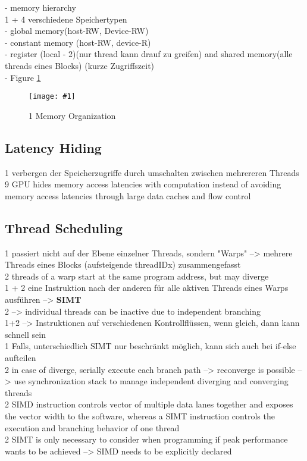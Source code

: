\documentclass[a4paper,12pt]{llncs}
\numberwithin{equation}{section}
\newcommand{\bild}[4]{
  \begin{figure}[htbp]
    \begin{center}
      \texttt{[image: \#1]}
      \caption[#4]{#3}
      \label{#2}
    \end{center}
  \end{figure}
}
\begin{document}
	  
    - memory hierarchy\\
      1 + 4 verschiedene Speichertypen\\
        - global memory(host-RW, Device-RW)\\
        - constant memory (host-RW, device-R)\\
        - register (local - 2)(nur thread kann drauf zu greifen) and shared memory(alle threads eines Blocks) (kurze Zugriffszeit)\\
        - Figure \ref{fig:memorga}
    \bild{figures/speicheroragnisation.jpg}{fig:memorga}{1 Memory Organization}{}
        
\subsection{Latency Hiding}
  1 verbergen der Speicherzugriffe durch umschalten zwischen mehrereren Threads
  9 GPU hides memory access latencies with computation instead of avoiding memory access latencies through large data caches and flow control


\subsection{Thread Scheduling}
    1 passiert nicht auf der Ebene einzelner Threads, sondern "Warps" --> mehrere Threads eines Blocks (aufsteigende threadIDx) zusammengefasst\\
    2 threads of a warp start at the same program address, but may diverge\\
    1 + 2 eine Instruktion nach der anderen für alle aktiven Threads eines Warps ausführen --> \textbf{SIMT}\\
    2 --> individual threads can be inactive due to independent branching\\
    1+2 --> Instruktionen auf verschiedenen Kontrollflüssen, wenn gleich, dann kann schnell sein\\
      1 Falls, unterschiedlich SIMT nur beschränkt möglich, kann sich auch bei if-else aufteilen\\
      2 in case of diverge, serially execute each branch path --> reconverge is possible --> use synchronization stack to manage independent diverging and converging threads\\
      2 SIMD instruction controls vector of multiple data lanes together and exposes the vector width to the software, whereas a SIMT instruction controls the execution and branching behavior of one thread\\
      2 SIMT is only necessary to consider when programming if peak performance wants to be achieved --> SIMD needs to be explicitly declared\\
\end{document}
